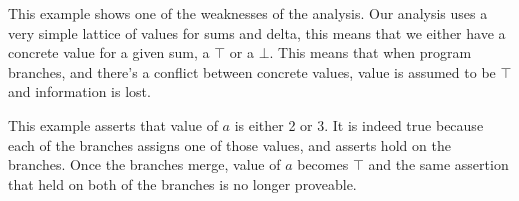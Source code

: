 This example shows one of the weaknesses of the analysis. Our analysis
uses a very simple lattice of values for sums and delta, this means that
we either have a concrete value for a given sum, a $\top$ or a $\bot$.
This means that when program branches, and there's a conflict between
concrete values, value is assumed to be $\top$ and information is lost.

This example asserts that value of $a$ is either 2 or 3. It is indeed
true because each of the branches assigns one of those values, and
asserts hold on the branches.  Once the branches merge, value of $a$
becomes $\top$ and the same assertion that held on both of the branches
is no longer proveable.

